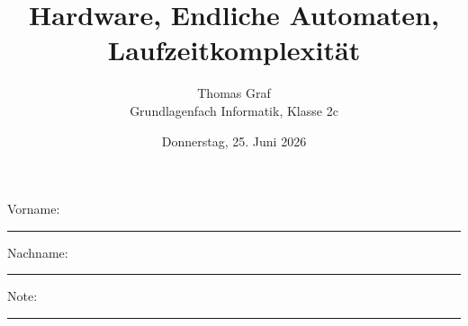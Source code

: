 \newtoggle{withbonus} \toggletrue{withbonus} %

\newcommand{\mycourse}{Grundlagenfach Informatik}
\newcommand{\myclass}{Klasse 2c}
\newcommand{\mydate}{Donnerstag, 25. Juni 2026}

\title{\textbf{Hardware, Endliche Automaten, Laufzeitkomplexität}}
\author{Thomas Graf\\
	\mycourse, \myclass}
\date{\mydate}
\maketitle
\thispagestyle{headandfoot}

\begin{center}
\end{center}
\vspace{10mm}

\begin{center}
	Vorname: \rule{45mm}{0.8pt}\qquad Nachname: \rule{45mm}{0.8pt}
\end{center}
\vspace{20mm}

\begin{center}
	\iftoggle{withbonus} {
		\combinedgradetable[h][questions]
	} {
		\gradetable[h][questions]
	}
\end{center}
\vspace{15mm}
\begin{center}
	Note:
	\vspace{10mm}

	\rule{8mm}{1.2pt}
\end{center}
\clearpage


